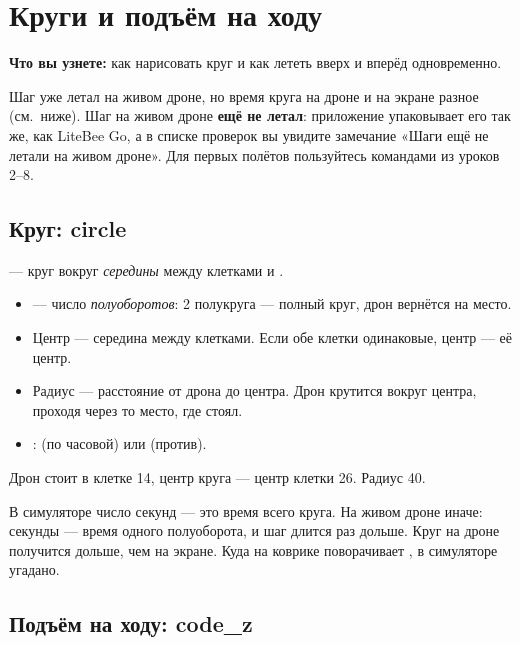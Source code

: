 \chapter{Круги и подъём на ходу}\label{ch:krugi}

\textbf{Что вы узнете:} как нарисовать круг и как лететь вверх и вперёд одновременно.

\begin{vnimanie}
Шаг  уже летал на живом дроне, но время круга на дроне и на экране разное (см.\ ниже). Шаг  на живом дроне \textbf{ещё не летал}: приложение упаковывает его так же, как LiteBee Go, а в списке проверок вы увидите замечание «Шаги  ещё не летали на живом дроне». Для первых полётов пользуйтесь командами из уроков 2--8.
\end{vnimanie}

\section{Круг: circle}

 — круг вокруг \emph{середины} между клетками  и .
\begin{itemize}
  \item {} --- число \emph{полуоборотов}: 2 полукруга --- полный круг, дрон вернётся на место.
  \item Центр --- середина между клетками. Если обе клетки одинаковые, центр --- её центр.
  \item Радиус --- расстояние от дрона до центра. Дрон крутится вокруг центра, проходя через то место, где стоял.
  \item {}:  (по часовой) или  (против).
\end{itemize}


Дрон стоит в клетке 14, центр круга --- центр клетки 26. Радиус 40\cm.

\begin{zametka}
В симуляторе число секунд --- это время всего круга. На живом дроне иначе: секунды --- время одного полуоборота, и шаг длится  раз дольше. Круг на дроне получится дольше, чем на экране. Куда на коврике поворачивает , в симуляторе угадано.
\end{zametka}

\section{Подъём на ходу: code\_z}

